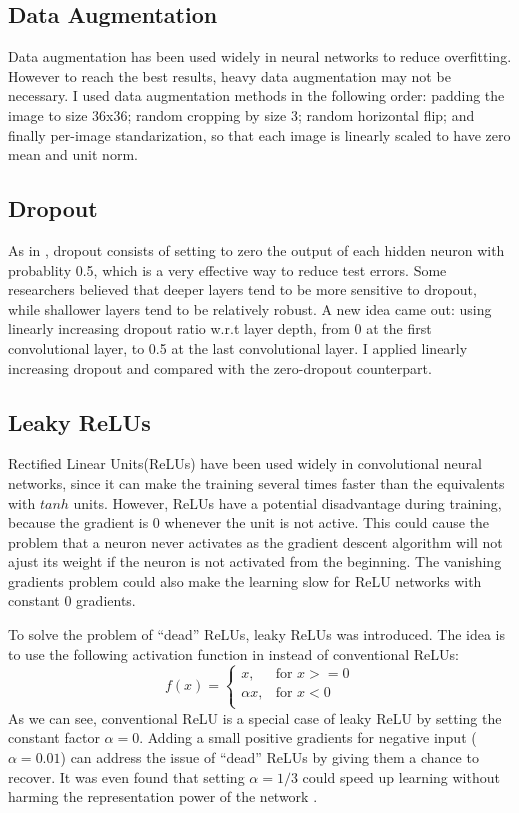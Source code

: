 \documentclass[conference]{IEEEtran}
\begin{document}
\subsection*{Data Augmentation}
Data augmentation has been used widely in neural networks to reduce overfitting\cite{conv}. However to reach the best results, heavy data augmentation may not be necessary\cite{wide}. I used data augmentation methods in the following order: padding the image to size 36x36; random cropping by size 3; random horizontal flip; and finally per-image standarization, so that each image is linearly scaled to have zero mean and unit norm.

\subsection*{Dropout}
As in \cite{conv}, dropout consists of setting to zero the output of each hidden neuron with probablity 0.5, which is a very effective way to reduce test errors. Some researchers believed that deeper layers tend to be more sensitive to dropout, while shallower layers tend to be relatively robust\cite{sparse,fmp}. A new idea came out: using linearly increasing dropout ratio w.r.t layer depth, from 0 at the first convolutional layer, to 0.5 at the last convolutional layer\cite{sparse,fmp}. I applied linearly increasing dropout and compared with the zero-dropout counterpart.

\subsection*{Leaky ReLUs}
Rectified Linear Units(ReLUs) have been used widely in convolutional neural networks, since it can make the training several times faster than the equivalents with $tanh$ units\cite{conv}. However, ReLUs have a potential disadvantage during training, because the gradient is 0 whenever the unit is not active. This could cause the problem that a neuron never activates as the gradient descent algorithm will not ajust its weight if the neuron is not activated from the beginning. The vanishing gradients problem could also make the learning slow for ReLU networks with constant 0 gradients\cite{leaky}.

To solve the problem of ``dead'' ReLUs, leaky ReLUs was introduced\cite{leaky}. The idea is to use the following activation function in  instead of conventional ReLUs:
$$
f(x)=
\begin{cases}
x, & \text{for } x >= 0\\
\alpha x, & \text{for } x < 0\\
\end{cases}
$$
As we can see, conventional ReLU is a special case of leaky ReLU by setting the constant factor $\alpha=0$. Adding a small positive gradients for negative input ($\alpha=0.01$) can address the issue of  ``dead'' ReLUs by giving them a chance to recover\cite{leaky}. It was even found that setting $\alpha=1/3$ could speed up learning without harming the representation power of the network \cite{sparse}.
\end{document}

